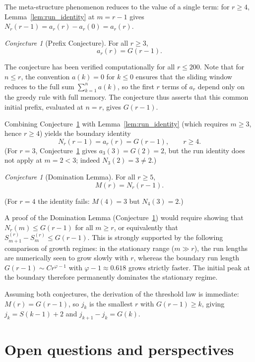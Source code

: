 \documentclass[12pt]{article}
\theoremstyle{definition}
\theoremstyle{remark}
\newtheorem{conjecture}[theorem]{Conjecture}
\begin{document}
The meta-structure phenomenon reduces to the value of a single term:
for $r\ge 4$, Lemma~\ref{lem:run_identity} at $m=r-1$ gives
$N_r(r-1)=a_r(r)-a_r(0)=a_r(r)$.

\begin{conjecture}[Prefix Conjecture]\label{conj:prefix}
  For all $r\ge 3$,
  \[
    a_r(r) = G(r-1).
  \]
\end{conjecture}

The conjecture has been verified computationally for all $r\le 200$.
Note that for $n\le r$, the convention $a(k)=0$ for $k\le 0$ ensures that the
sliding window reduces to the full sum $\sum_{k=1}^{n}a(k)$, so the
first $r$ terms of $a_r$ depend only on the greedy rule with full memory.
The conjecture thus asserts that this common initial prefix, evaluated at $n=r$,
gives $G(r-1)$.

Combining Conjecture~\ref{conj:prefix} with Lemma~\ref{lem:run_identity}
(which requires $m\ge 3$, hence $r\ge 4$) yields the boundary identity
\begin{equation}\label{eq:threshold}
  N_r(r-1)=a_r(r)=G(r-1),\qquad r\ge 4.
\end{equation}
(For $r=3$, Conjecture~\ref{conj:prefix} gives $a_3(3)=G(2)=2$, but the run identity
does not apply at $m=2<3$; indeed $N_3(2)=3\ne 2$.)

\begin{conjecture}[Domination Lemma]\label{conj:domination}
  For all $r\ge 5$,
  \[
    M(r) = N_r(r-1).
  \]
\end{conjecture}

(For $r=4$ the identity fails: $M(4)=3$ but $N_4(3)=2$.)

A proof of the Domination Lemma (Conjecture~\ref{conj:domination}) would require showing that $N_r(m)\le G(r-1)$
for all $m\ge r$, or equivalently that $S_{m+1}^{(r)}-S_m^{(r)}\le G(r-1)$.
This is strongly supported by the following comparison of growth regimes:
in the stationary range ($m\gg r$), the run lengths are numerically seen
to grow slowly with $r$, whereas the boundary run length
$G(r-1)\sim C r^{\varphi-1}$ with $\varphi-1\approx 0.618$ grows strictly faster.
The initial peak at the boundary therefore permanently dominates the stationary regime.

Assuming both conjectures, the derivation of the threshold law is immediate:
$M(r)=G(r-1)$, so $j_k$ is the smallest $r$ with $G(r-1)\ge k$,
giving $j_k=S(k-1)+2$ and $j_{k+1}-j_k=G(k)$.

\section{Open questions and perspectives}\label{sec:open}
\end{document}
